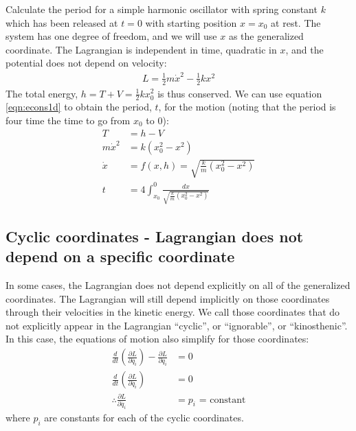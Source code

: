 \begin{example}{0pt}{Calculate the period for a simple harmonic oscillator with spring constant $k$ which has been released at $t=0$ with starting position $x=x_0$ at rest.}{}
The system has one degree of freedom, and we will use $x$ as the generalized coordinate. The Lagrangian is independent in time, quadratic in $x$, and the potential does not depend on velocity:
\begin{align*}
L=\frac{1}{2}m\dot{x}^2-\frac{1}{2}kx^2
\end{align*}
The total energy, $h=T+V=\frac{1}{2}kx_0^2$ is thus conserved. We can use equation \ref{eqn:econs1d} to obtain the period, $t$, for the motion (noting that the period is four time the time to go from $x_0$ to $0$):
\begin{align*}
T&=h-V\\
m\dot{x}^2&=k(x_0^2-x^2)\\
\dot{x}&=f(x,h)=\sqrt{\frac{k}{m}(x_0^2-x^2)}\\
t&=4\int_{x_0}^{0}\frac{dx}{\sqrt{\frac{k}{m}(x_0^2-x^2)}}
\end{align*}
\end{example}

\subsection{Cyclic coordinates - Lagrangian does not depend on a specific coordinate}
In some cases, the Lagrangian does not depend explicitly on all of the generalized coordinates. The Lagrangian will still depend implicitly on those coordinates through their velocities in the kinetic energy. We call those coordinates that do not explicitly appear in the Lagrangian ``cyclic'', or ``ignorable'', or ``kinosthenic''. In this case, the equations of motion also simplify for those coordinates:
\begin{align}
\frac{d}{dt}\left(\frac{\partial L}{\partial \dot{q_i}} \right) - \frac{\partial L}{\partial q_i}&=0\nonumber\\
\frac{d}{dt}\left(\frac{\partial L}{\partial \dot{q_i}} \right)&=0\nonumber\\
\therefore \frac{\partial L}{\partial \dot{q_i}}&=p_i \text{		=  constant}
\label{eqn:cyclic}
\end{align}
where $p_i$ are constants for each of the cyclic coordinates.

